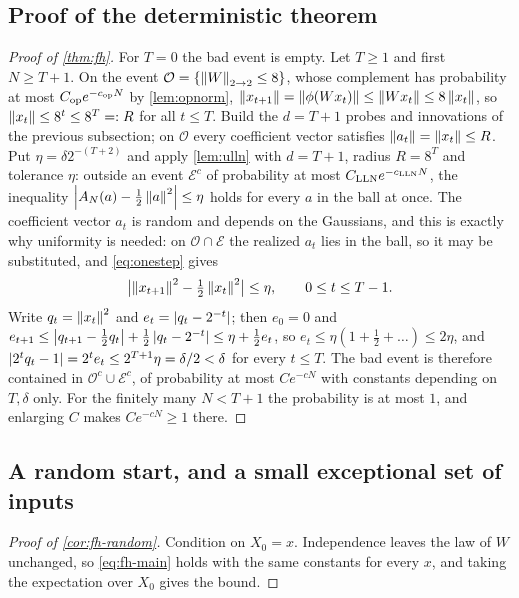 \subsection{Proof of the deterministic theorem}

\begin{proof}[Proof of \cref{thm:fh}]
For $T=0$ the bad event is empty. Let $T\ge1$ and first $N\ge T+1$. On the event $\mathcal O=\{\left\lVert W\right\rVert_{2\to 2}\le8\}$, whose complement has probability at most $C_{\rm op}e^{-c_{\rm op}N}$ by \cref{lem:opnorm}, $\left\lVert x_{t+1}\right\rVert=\left\lVert \phi(Wx_t)\right\rVert\le\left\lVert Wx_t\right\rVert\le8\left\lVert x_t\right\rVert$, so $\left\lVert x_t\right\rVert\le8^t\le8^T=:R$ for all $t\le T$. Build the $d=T+1$ probes and innovations of the previous subsection; on $\mathcal O$ every coefficient vector satisfies $\left\lVert a_t\right\rVert=\left\lVert x_t\right\rVert\le R$. Put $\eta=\delta2^{-(T+2)}$ and apply \cref{lem:ulln} with $d=T+1$, radius $R=8^T$ and tolerance $\eta$: outside an event $\mathcal E^c$ of probability at most $C_{\rm LLN}e^{-c_{\rm LLN}N}$, the inequality $\left\lvert A_N(a)-\tfrac12\left\lVert a\right\rVert^2\right\rvert\le\eta$ holds for every $a$ in the ball at once. The coefficient vector $a_t$ is random and depends on the Gaussians, and this is exactly why uniformity is needed: on $\mathcal O\cap\mathcal E$ the realized $a_t$ lies in the ball, so it may be substituted, and \cref{eq:onestep} gives
\[
\bigl|\left\lVert x_{t+1}\right\rVert^2-\tfrac12\left\lVert x_t\right\rVert^2\bigr|\le\eta,\qquad0\le t\le T-1 .
\]
Write $q_t=\left\lVert x_t\right\rVert^2$ and $e_t=\left\lvert q_t-2^{-t}\right\rvert$; then $e_0=0$ and $e_{t+1}\le\left\lvert q_{t+1}-\tfrac12q_t\right\rvert+\tfrac12\left\lvert q_t-2^{-t}\right\rvert\le\eta+\tfrac12e_t$, so $e_t\le\eta(1+\tfrac12+\dots)\le2\eta$, and $\left\lvert 2^tq_t-1\right\rvert=2^te_t\le2^{T+1}\eta=\delta/2<\delta$ for every $t\le T$. The bad event is therefore contained in $\mathcal O^c\cup\mathcal E^c$, of probability at most $Ce^{-cN}$ with constants depending on $T,\delta$ only. For the finitely many $N<T+1$ the probability is at most $1$, and enlarging $C$ makes $Ce^{-cN}\ge1$ there.
\end{proof}

\subsection{A random start, and a small exceptional set of inputs}

\begin{proof}[Proof of \cref{cor:fh-random}]
Condition on $X_0=x$. Independence leaves the law of $W$ unchanged, so \cref{eq:fh-main} holds with the same constants for every $x$, and taking the expectation over $X_0$ gives the bound.
\end{proof}

